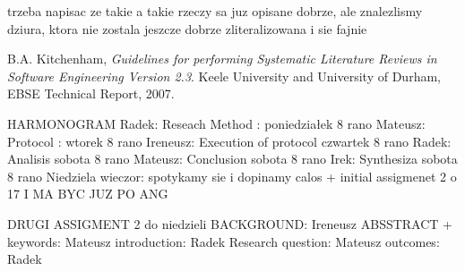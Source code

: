 \documentclass[times, 10pt,twocolumn]{article}
\begin{document}

trzeba napisac ze takie a takie rzeczy sa juz opisane dobrze, ale znalezlismy dziura, ktora
nie zostala jeszcze dobrze zliteralizowana i sie fajnie

\begin{thebibliography}{9}

  B.A. Kitchenham,
  \emph{Guidelines for performing Systematic Literature Reviews in Software Engineering Version 2.3}.
  Keele University and University of Durham,
  EBSE Technical Report,
  2007.

\end{thebibliography}

\nocite{ex1,ex2}
 

HARMONOGRAM
Radek: Reseach Method : poniedziałek 8 rano
Mateusz: Protocol : wtorek 8 rano
Ireneusz: Execution of protocol czwartek 8 rano
Radek: Analisis sobota 8 rano
Mateusz: Conclusion sobota 8 rano
Irek: Synthesiza sobota 8 rano
Niedziela wieczor: spotykamy sie i dopinamy calos + initial assigmenet 2 o 17 I MA BYC JUZ PO ANG


DRUGI
ASSIGMENT 2 do niedzieli
BACKGROUND: Ireneusz
ABSSTRACT + keywords: Mateusz
introduction: Radek
Research question: Mateusz
outcomes: Radek
\end{document}
